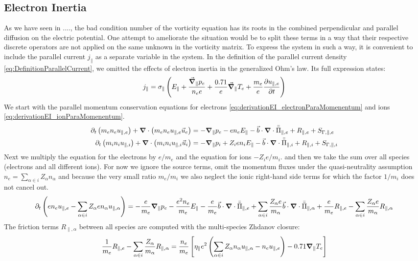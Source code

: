 \subsection{Electron Inertia}
\label{ssec:ModelElectronInertia}
As we have seen in ...., the bad condition number of the vorticity equation has its roots in the combined perpendicular and parallel diffusion on the electric potential. One attempt to ameliorate the situation would be to split these terms in a way that their respective discrete operators are not applied on the same unknown in the vorticity matrix. To express the system in such a way, it is convenient to include the parallel current $j_\parallel$ as a separate variable in the system. In the definition of the parallel current density \autoref{eq:DefinitionParallelCurrent}, we omitted the effects of electron inertia in the generalized Ohm's law. Its full expression states:
$$ 
j_\parallel = \sigma_\parallel \left(E_\parallel + \frac{\vec{\grad}_\parallel p_e}{n_ee} + \frac{0.71}{e}\vec{\grad}_\parallel T_e + \frac{m_e}{e} \pdv{u_{\parallel,e}}{t}\right) 
$$
We start with the parallel momentum conservation equations for electrons \ref{eq:derivationEI_electronParaMomenentum} and ions \ref{eq:derivationEI_ionParaMomenentum}.
\begin{align}
	\partial_t\left(m_en_eu_{\parallel,e}\right) + \grad\cdot\left(m_en_eu_{\parallel,e}\vec{u}_e\right) &= -\grad_\parallel p_e - en_eE_\parallel - \vec{b}\cdot\grad\cdot\bar{\bar{\Pi}}_{\parallel,e} + R_{\parallel,e} + S_{\Gamma,\parallel,e} \label{eq:derivationEI_electronParaMomenentum} \\
	\partial_t\left(m_in_iu_{\parallel,i}\right) + \grad\cdot\left(m_in_iu_{\parallel,i}\vec{u}_i\right) &= -\grad_\parallel p_i + Z_ien_iE_\parallel - \vec{b}\cdot\grad\cdot\bar{\bar{\Pi}}_{\parallel,i} + R_{\parallel,i} + S_{\Gamma,\parallel,i} \label{eq:derivationEI_ionParaMomenentum}
\end{align}
Next we multiply the equation for the electrons by $e/m_e$ and the equation for ions $-Z_ie/m_i$. and then we take the sum over all species (electrons and all different ions). For now we ignore the source terms, omit the momentum fluxes under the quasi-neutrality assumption $n_e = \sum_{\alpha \in i}Z_\alpha n_\alpha$ and because the very small ratio $m_e/m_i$ we also neglect the ionic right-hand side terms for which the factor $1/m_i$ does not cancel out.
$$
\partial_t\left(en_eu_{\parallel,e} - \sum_{\alpha \in i}Z_\alpha en_\alpha u_{\parallel,\alpha} \right) = -\frac{e}{m_e}\grad_\parallel p_e - \frac{e^2n_e}{m_e}E_\parallel - \frac{e}{m_e}\vec{b}\cdot\grad\cdot\bar{\bar{\Pi}}_{\parallel,e} + \sum_{\alpha \in i}\frac{Z_\alpha e}{m_\alpha} \vec{b}\cdot\grad\cdot\bar{\bar{\Pi}}_{\parallel,\alpha} + \frac{e}{m_e}R_{\parallel,e} - \sum_{\alpha \in i}\frac{Z_\alpha e}{m_\alpha} R_{\parallel,\alpha}
$$
The friction terms $R_{\parallel,\alpha}$ between all species are computed with the multi-species Zhdanov closure:
$$
\frac{1}{m_e}R_{\parallel,e} - \sum_{\alpha \in i}\frac{Z_\alpha}{m_\alpha} R_{\parallel,\alpha} = \frac{n_e}{m_e}\left[\eta_\parallel e^2\left(\sum_{\alpha \in i}Z_\alpha n_\alpha u_{\parallel,\alpha} - n_eu_{\parallel,e}\right) - 0.71\grad_\parallel T_e\right]
$$

